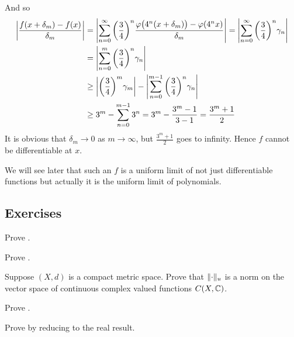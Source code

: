 \begin{example}
And so
\begin{equation*}
\begin{split}
\left\lvert {
\frac{f(x+\delta_m)-f(x)}{\delta_m}
} \right\rvert
& =
\left\lvert {
\sum_{n=0}^\infty 
{\left(\frac{3}{4}\right)}^n
\frac{\varphi\bigl(4^n(x+\delta_m)\bigr)-\varphi(4^nx)}{\delta_m}
} \right\rvert
=
\left\lvert {
\sum_{n=0}^\infty 
{\left(\frac{3}{4}\right)}^n
\gamma_n
} \right\rvert
\\
& =
\left\lvert {
\sum_{n=0}^m 
{\left(\frac{3}{4}\right)}^n
\gamma_n
} \right\rvert
\\
& \geq
\left\lvert {
{\left(\frac{3}{4}\right)}^m
\gamma_m} \right\rvert
-
\left\lvert {
\sum_{n=0}^{m-1} 
{\left(\frac{3}{4}\right)}^n
\gamma_n
} \right\rvert
\\
& \geq
3^m
-
\sum_{n=0}^{m-1} 
3^n
=
3^m
-
\frac{3^{m}-1}{3-1}
=
\frac{3^m +1}{2}
\end{split}
\end{equation*}
It is obvious that $\delta_m \to 0$ as $m \to \infty$, but $\frac{3^m+1}{2}$
goes to infinity.  Hence $f$ cannot be differentiable at $x$.

We will see later that such an $f$ is a uniform limit of not just
differentiable functions but actually it is the uniform limit of
polynomials.
\end{example}

\subsection{Exercises}

\begin{exercise}
Prove .
\end{exercise}

\begin{exercise}
Prove .
\end{exercise}

\begin{exercise}
Suppose $(X,d)$ is a compact metric space.
Prove that $\lVert {\cdot} \rVert_u$ is a norm on the vector space of
continuous complex valued functions $C(X,{\mathbb{C}})$.
\end{exercise}

\begin{exercise}
Prove .
\end{exercise}

\begin{exercise}
Prove  by reducing to the real
result.
\end{exercise}

